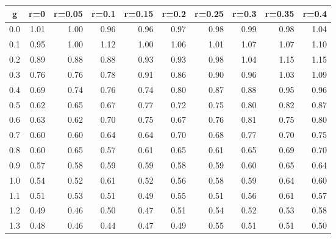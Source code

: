 %
\begin{table}[!tbp]
 \begin{center}
 \begin{tabular}{rrrrrrrrrr}\hline\hline
\multicolumn{1}{c}{g}&\multicolumn{1}{c}{r=0}&\multicolumn{1}{c}{r=0.05}&\multicolumn{1}{c}{r=0.1}&\multicolumn{1}{c}{r=0.15}&\multicolumn{1}{c}{r=0.2}&\multicolumn{1}{c}{r=0.25}&\multicolumn{1}{c}{r=0.3}&\multicolumn{1}{c}{r=0.35}&\multicolumn{1}{c}{r=0.4}\tabularnewline
\hline
0.0&1.01&1.00&0.96&0.96&0.97&0.98&0.99&0.98&1.04\tabularnewline
0.1&0.95&1.00&1.12&1.00&1.06&1.01&1.07&1.07&1.10\tabularnewline
0.2&0.89&0.88&0.88&0.93&0.93&0.98&1.04&1.15&1.15\tabularnewline
0.3&0.76&0.76&0.78&0.91&0.86&0.90&0.96&1.03&1.09\tabularnewline
0.4&0.69&0.74&0.76&0.74&0.80&0.87&0.88&0.95&0.96\tabularnewline
0.5&0.62&0.65&0.67&0.77&0.72&0.75&0.80&0.82&0.87\tabularnewline
0.6&0.63&0.62&0.70&0.75&0.67&0.76&0.81&0.75&0.80\tabularnewline
0.7&0.60&0.60&0.64&0.64&0.70&0.68&0.77&0.70&0.75\tabularnewline
0.8&0.60&0.65&0.57&0.61&0.65&0.61&0.65&0.69&0.70\tabularnewline
0.9&0.57&0.58&0.59&0.59&0.58&0.59&0.60&0.65&0.64\tabularnewline
1.0&0.54&0.52&0.61&0.52&0.56&0.58&0.59&0.64&0.60\tabularnewline
1.1&0.51&0.53&0.51&0.49&0.55&0.51&0.56&0.61&0.57\tabularnewline
1.2&0.49&0.46&0.50&0.47&0.51&0.54&0.52&0.53&0.58\tabularnewline
1.3&0.48&0.46&0.44&0.47&0.49&0.55&0.51&0.51&0.50\tabularnewline
\hline
\end{tabular}

\end{center}

\end{table}

